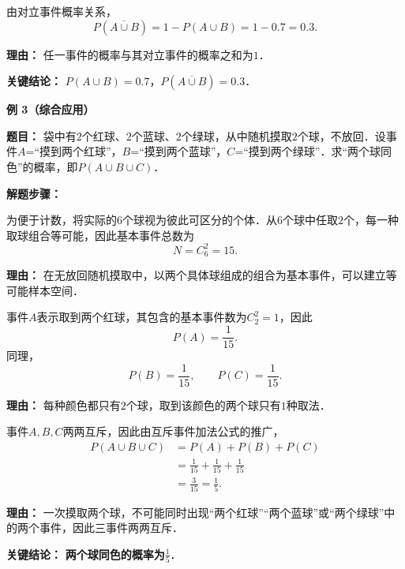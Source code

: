 \begin{examplebox}
\begin{description}[style=nextline, leftmargin=2.8em, labelsep=0.5em, itemsep=0.45em]
    \item[\textbf{第三步（求对立事件概率）：}]
    由对立事件概率关系，
    \[
        P(\overline{A\cup B})
        =
        1-P(A\cup B)
        =
        1-0.7
        =
        0.3.
    \]
    \par\textbf{理由：}
    任一事件的概率与其对立事件的概率之和为$1$．
\end{description}

\textbf{\textcolor{CExample}{关键结论：}}
\textbf{$P(A\cup B)=0.7$}，\textbf{$P(\overline{A\cup B})=0.3$}．

\medskip
\textbf{\textcolor{CExample}{例 3（综合应用）}}

\textbf{\textcolor{CExample}{题目：}}
袋中有$2$个红球、$2$个蓝球、$2$个绿球，从中随机摸取$2$个球，不放回．设事件$A$=“摸到两个红球”，$B$=“摸到两个蓝球”，$C$=“摸到两个绿球”．求“两个球同色”的概率，即$P(A\cup B\cup C)$．

\textbf{\textcolor{CExample}{解题步骤：}}
\begin{description}[style=nextline, leftmargin=2.8em, labelsep=0.5em, itemsep=0.45em]
    \item[\textbf{第一步（建立等可能样本空间）：}]
    为便于计数，将实际的$6$个球视为彼此可区分的个体．从$6$个球中任取$2$个，每一种取球组合等可能，因此基本事件总数为
    \[
        N=C_6^2=15.
    \]
    \par\textbf{理由：}
    在无放回随机摸取中，以两个具体球组成的组合为基本事件，可以建立等可能样本空间．

    \item[\textbf{第二步（计算各事件概率）：}]
    事件$A$表示取到两个红球，其包含的基本事件数为$C_2^2=1$，因此
    \[
        P(A)=\frac{1}{15}.
    \]
    同理，
    \[
        P(B)=\frac{1}{15},\qquad
        P(C)=\frac{1}{15}.
    \]
    \par\textbf{理由：}
    每种颜色都只有$2$个球，取到该颜色的两个球只有$1$种取法．

    \item[\textbf{第三步（应用加法公式）：}]
    事件$A,B,C$两两互斥，因此由互斥事件加法公式的推广，
    \[
        \begin{aligned}
        P(A\cup B\cup C)
        &=
        P(A)+P(B)+P(C)\\
        &=
        \frac{1}{15}+\frac{1}{15}+\frac{1}{15}\\
        &=
        \frac{3}{15}
        =
        \frac{1}{5}.
        \end{aligned}
    \]
    \par\textbf{理由：}
    一次摸取两个球，不可能同时出现“两个红球”“两个蓝球”或“两个绿球”中的两个事件，因此三事件两两互斥．
\end{description}

\textbf{\textcolor{CExample}{关键结论：}}
\textbf{两个球同色的概率为$\displaystyle\frac{1}{5}$}．
\end{examplebox}
